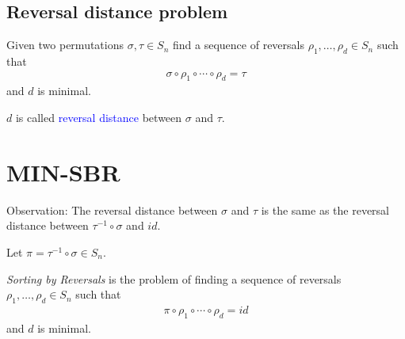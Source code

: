 \documentclass{beamer}
\theoremstyle{definition}
\def\padding{\vspace{0.5cm}}
\def\b{\textcolor{blue}}
\begin{document}
\subsection{Reversal distance problem}

\begin{frame}

\begin{definition}
Given two permutations $\sigma, \tau \in S_n$ find a sequence of reversals $\rho_1, \dots, \rho_d \in S_n$ such that
\begin{align*}
    \sigma \circ \rho_1 \circ \cdots \circ \rho_d = \tau
\end{align*}
and $d$ is minimal. \pause\par\padding
$d$ is called \b{reversal distance} between $\sigma$ and $\tau$. \cite{Kececioglu1995}
\end{definition}

\end{frame}

\section{MIN-SBR}

\begin{frame}

Observation: The reversal distance between $\sigma$ and $\tau$ is the same as the reversal distance between $\tau^{-1} \circ \sigma$ and $id$. \pause\padding

\begin{definition}
Let $\pi = \tau^{-1} \circ \sigma \in S_n$. \par\pause
\textit{Sorting by Reversals} is the problem of finding a sequence of reversals $\rho_1, \dots, \rho_d \in S_n$ such that
\begin{align*}
    \pi \circ \rho_1 \circ \cdots \circ \rho_d = id
\end{align*}
and $d$ is minimal. \cite{Kececioglu1995}
\end{definition}

\end{frame}
\end{document}
